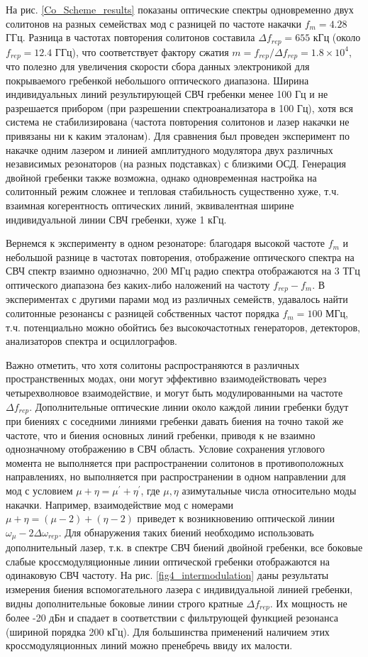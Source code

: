 На рис. \ref{Co_Scheme_results} показаны оптические спектры одновременно двух солитонов на разных семействах мод с разницей по частоте накачки $f_m=4.28$ ГГц. Разница в частотах повторения солитонов составила $\Delta f_{rep}=655$ кГц (около $f_{rep}=12.4$ ГГц), что соответствует фактору сжатия \cite{Coddington2016} $m=f_{rep}/\Delta f_{rep}=1.8\times10^4$, что полезно для увеличения скорости сбора данных электроникой для покрываемого гребенкой небольшого оптического диапазона. Ширина индивидуальных линий результирующей СВЧ гребенки менее 100 Гц и не разрешается прибором (при разрешении спектроанализатора в 100 Гц), хотя вся система не стабилизирована (частота повторения солитонов и лазер накачки не привязаны ни к каким эталонам). Для сравнения был проведен эксперимент по накачке одним лазером и линией амплитудного модулятора двух различных независимых резонаторов (на разных подставках) с близкими ОСД. Генерация двойной гребенки также возможна, однако одновременная настройка на солитонный режим сложнее и тепловая стабильность существенно хуже, т.ч. взаимная когерентность оптических линий, эквивалентная ширине индивидуальной линии СВЧ гребенки, хуже 1 кГц.

Вернемся к эксперименту в одном резонаторе: благодаря высокой частоте $f_m$ и небольшой разнице в частотах повторения, отображение оптического спектра на СВЧ спектр взаимно однозначно, 200 МГц радио спектра отображаются на 3 ТГц оптического диапазона без каких-либо наложений на частоту $f_{rep}-f_m$. В экспериментах с другими парами мод из различных семейств, удавалось найти солитонные резонансы с разницей собственных частот порядка $f_m=100$ МГц, т.ч. потенциально можно обойтись без высокочастотных генераторов, детекторов, анализаторов спектра и осциллографов.

Важно отметить, что хотя солитоны распространяются в различных пространственных модах, они могут эффективно взаимодействовать через четырехволновое взаимодействие, и могут быть модулированными на частоте $\Delta f_{rep}$. Дополнительные оптические линии около каждой линии гребенки будут при биениях с соседними линиями гребенки давать биения на точно такой же частоте, что и биения основных линий гребенки, приводя к не взаимно однозначному отображению в СВЧ область. Условие сохранения углового момента не выполняется при распространении солитонов в противоположных направлениях, но выполняется при распространении в одном направлении для мод с условием $\mu+\eta=\mu^\prime+\eta^\prime$, где $\mu,\eta$ азимутальные числа относительно моды накачки. Например, взаимодействие мод с номерами $\mu+\eta=(\mu-2)+(\eta-2)$ приведет к возникновению оптической линии $\omega_{\mu}-2\Delta\omega_{rep}$. Для обнаружения таких биений необходимо использовать дополнительный лазер, т.к. в спектре СВЧ биений двойной гребенки, все боковые слабые кроссмодуляционные линии оптической гребенки отображаются на одинаковую СВЧ частоту. На рис. \ref{fig4_intermodulation} даны результаты измерения биения вспомогательного лазера с индивидуальной линией гребенки, видны дополнительные боковые линии строго кратные $\Delta f_{rep}$. Их мощность не более -20 дБн и спадает в соответствии с фильтрующей функцией резонанса (шириной порядка 200 кГц). Для большинства применений наличием этих кроссмодуляционных линий можно пренебречь ввиду их малости.

